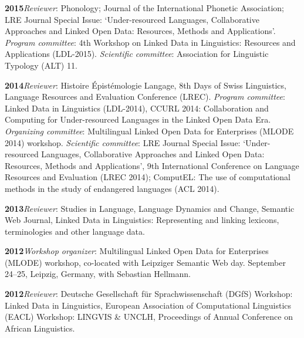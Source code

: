 \documentclass[11pt]{article}
\newcommand{\hangpara}{
 \setlength{\parindent}{0in} %
 \hangindent=0.42in %
}
\begin{document}

\vskip 6pt
\hangpara
{\bf 2015}\hspace{1ex}\textit{Reviewer}: Phonology; Journal of the International Phonetic Association; LRE Journal Special Issue: `Under-resourced Languages, Collaborative Approaches and Linked Open Data: Resources, Methods and Applications'. \textit{Program committee}: 4th Workshop on Linked Data in Linguistics: Resources and Applications (LDL-2015). \textit{Scientific committee}: Association for Linguistic Typology (ALT) 11.

\vskip 6pt
\hangpara
{\bf 2014}\hspace{1ex}\textit{Reviewer}: Histoire {\'E}pist{\'e}mologie Langage, 8th Days of Swiss Linguistics, Language Resources and Evaluation Conference (LREC). \textit{Program committee}: Linked Data in Linguistics (LDL-2014), CCURL 2014: Collaboration and Computing for Under-resourced Languages in the Linked Open Data Era. \textit{Organizing committee}: Multilingual Linked Open Data for Enterprises (MLODE 2014) workshop. \textit{Scientific committee}: LRE Journal Special Issue: `Under-resourced Languages, Collaborative Approaches and Linked Open Data: Resources, Methods and Applications', 9th International Conference on Language Resources and Evaluation (LREC 2014); ComputEL: The use of computational methods in the study of endangered languages (ACL 2014).

\vskip 6pt
\hangpara
{\bf 2013}\hspace{1ex}\textit{Reviewer}: Studies in Language, Language Dynamics and Change, Semantic Web Journal, Linked Data in Linguistics: Representing and linking lexicons, terminologies and other language data.

\vskip 6pt
\hangpara
{\bf 2012}\hspace{1ex}\textit{Workshop organizer}: Multilingual Linked Open Data for Enterprises (MLODE) workshop, co-located with Leipziger Semantic Web day. September 24--25, Leipzig, Germany, with Sebastian Hellmann.

\vskip 6pt
\hangpara
{\bf 2012}\hspace{1ex}\textit{Reviewer}: Deutsche Gesellschaft f{\"u}r Sprachwissenschaft (DGfS) Workshop: Linked Data in Linguistics, European Association of Computational Linguistics (EACL) Workshop: LINGVIS \& UNCLH, Proceedings of Annual Conference on African Linguistics.
\end{document}

